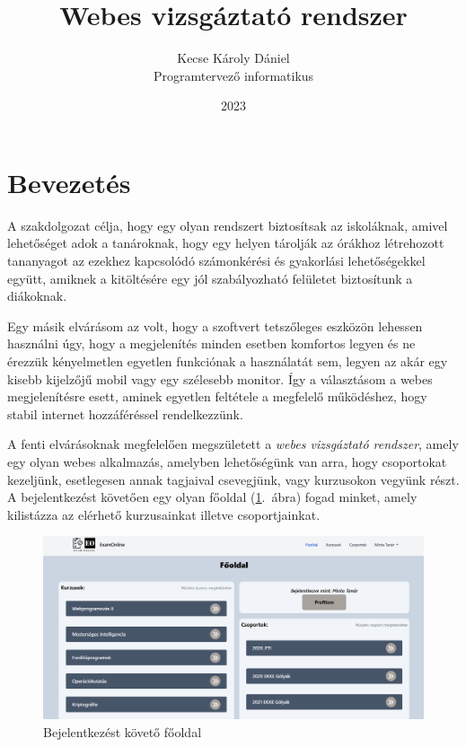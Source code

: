 \documentclass[
]{thesis-ekf}
\theoremstyle{definition}
\theoremstyle{remark}
\begin{document}
	\title{Webes vizsgáztató rendszer}
	\author{Kecse Károly Dániel\\Programtervező informatikus}
	\date{2023}
	\maketitle
	\tableofcontents
	
	\chapter*{Bevezetés}
	A szakdolgozat célja, hogy egy olyan rendszert biztosítsak az iskoláknak, amivel lehetőséget adok a tanároknak, hogy egy helyen tárolják az órákhoz létrehozott tananyagot az ezekhez kapcsolódó számonkérési és gyakorlási lehetőségekkel együtt, amiknek a kitöltésére egy jól szabályozható felületet biztosítunk a diákoknak.
 
	Egy másik elvárásom az volt, hogy a szoftvert tetszőleges eszközön lehessen használni úgy, hogy a megjelenítés minden esetben komfortos legyen és ne érezzük kényelmetlen egyetlen funkciónak a használatát sem, legyen az akár egy kisebb kijelzőjű mobil vagy egy szélesebb monitor. Így a választásom a webes megjelenítésre esett, aminek egyetlen feltétele a megfelelő működéshez, hogy stabil internet hozzáféréssel rendelkezzünk.

        A fenti elvárásoknak megfelelően megszületett a \emph{webes vizsgáztató rendszer}, amely egy olyan webes alkalmazás, amelyben lehetőségünk van arra, hogy csoportokat kezeljünk, esetlegesen annak tagjaival csevegjünk, vagy kurzusokon vegyünk részt. A bejelentkezést követően egy olyan főoldal (\ref{fig-index-page}.~ábra) fogad minket, amely kilistázza az elérhető kurzusainkat illetve csoportjainkat.
        \begin{figure}[ht!]
    	\centering
    	\includegraphics[width=15cm]{index_page.png}
            \caption{Bejelentkezést követő főoldal}
    	\label{fig-index-page}
        \end{figure}
\end{document}
